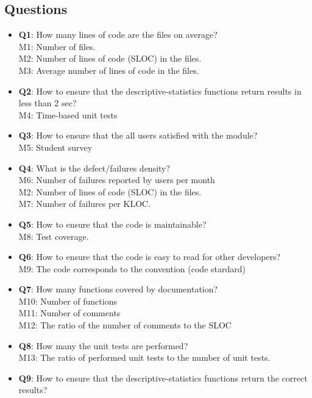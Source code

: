 \documentclass[12pt]{article}
\begin{document}
\subsection{Questions}

\begin{itemize}
    \item \textbf{Q1}: How many lines of code are the files on average?\\
     M1: Number of files.\\
     M2: Number of lines of code (SLOC) in the files.\\
     M3: Average number of lines of code in the files. 
    \item \textbf{Q2}: How to ensure that the descriptive-statistics functions return results in less than 2 sec? \\
     M4: Time-based unit tests
    \item \textbf{Q3}: How to ensure that the all users satisfied with the module?\\
     M5: Student survey
    \item \textbf{Q4}: What is the defect/failures density?\\
     M6: Number of failures reported by users per month\\
     M2: Number of lines of code (SLOC) in the files.\\
     M7: Number of failures per KLOC.
    \item \textbf{Q5}: How to ensure that the code is maintainable?\\
     M8: Test coverage.
    \item \textbf{Q6}: How to ensure that the code is easy to read for other developers?\\
     M9: The code corresponds to the convention (code stardard)
    \item \textbf{Q7}: How many functions covered by documentation?\\
     M10: Number of functions\\
     M11: Number of comments\\
     M12: The ratio of the number of comments to the SLOC
    \item \textbf{Q8}: How many the unit tests are performed?\\
     M13: The ratio of performed unit tests to the number of unit tests.
    \item \textbf{Q9}: How to ensure that the descriptive-statistics functions return the correct results?\\

\end{itemize}
\end{document}
